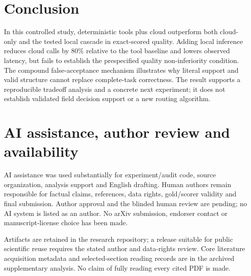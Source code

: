 \documentclass[10pt,a4paper,twocolumn]{article}
\begin{document}
\section{Conclusion}

In this controlled study, deterministic tools plus cloud outperform both cloud-only and the tested local cascade in exact-scored quality. Adding local inference reduces cloud calls by 80\% relative to the tool baseline and lowers observed latency, but fails to establish the prespecified quality non-inferiority condition. The compound false-acceptance mechanism illustrates why literal support and valid structure cannot replace complete-task correctness. The result supports a reproducible tradeoff analysis and a concrete next experiment; it does not establish validated field decision support or a new routing algorithm.

\section{AI assistance, author review and availability}

AI assistance was used substantially for experiment/audit code, source organization, analysis support and English drafting. Human authors remain responsible for factual claims, references, data rights, gold/scorer validity and final submission. Author approval and the blinded human review are pending; no AI system is listed as an author. No arXiv submission, endorser contact or manuscript-license choice has been made.

Artifacts are retained in the research repository; a release suitable for public scientific reuse requires the stated author and data-rights review. Core literature acquisition metadata and selected-section reading records are in the archived supplementary analysis. No claim of fully reading every cited PDF is made.
\end{document}
